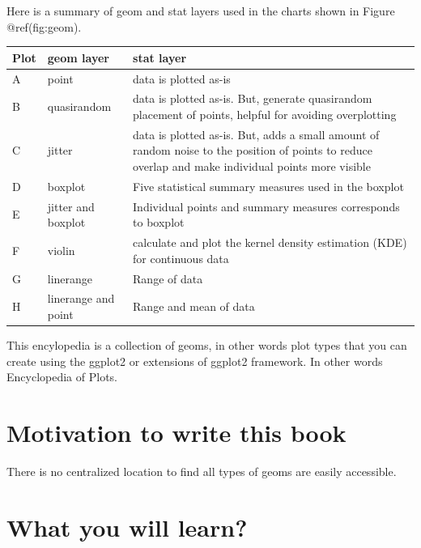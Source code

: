 \documentclass[
  letterpaper,
  DIV=11,
  numbers=noendperiod]{scrreprt}
\begin{document}
Here is a summary of geom and stat layers used in the charts shown in
Figure @ref(fig:geom).

\begin{table}
\centering
\begin{tabular}[t]{l|l|l}
\hline
Plot & geom layer & stat layer\\
\hline
A & point & data is plotted as-is\\
\hline
B & quasirandom & data is plotted as-is. But, generate quasirandom placement of points, helpful for avoiding overplotting\\
\hline
C & jitter & data is plotted as-is. But, adds a small amount of random noise to the position of points to reduce overlap and make individual points more visible\\
\hline
D & boxplot & Five statistical summary measures used in the boxplot\\
\hline
E & jitter and boxplot & Individual points and summary measures corresponds to boxplot\\
\hline
F & violin & calculate and plot the kernel density estimation (KDE) for continuous data\\
\hline
G & linerange & Range of data\\
\hline
H & linerange and point & Range and mean of data\\
\hline
\end{tabular}
\end{table}

This encylopedia is a collection of geoms, in other words plot types
that you can create using the ggplot2 or extensions of ggplot2
framework. In other words {Encyclopedia of Plots}.

\section*{Motivation to write this
book}\label{motivation-to-write-this-book}


There is no centralized location to find all types of geoms are easily
accessible.

\section*{What you will learn?}\label{what-you-will-learn}
\end{document}
